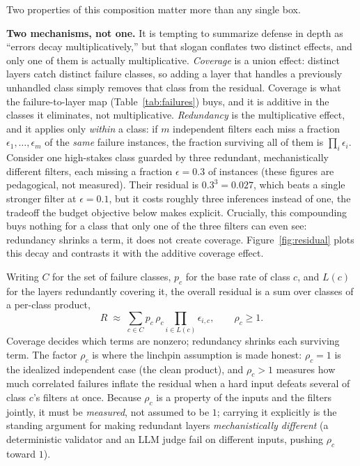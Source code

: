 \documentclass[11pt]{article}
\begin{document}
Two properties of this composition matter more than any single box.

\textbf{Two mechanisms, not one.} It is tempting to summarize defense in depth as
``errors decay multiplicatively,'' but that slogan conflates two distinct effects,
and only one of them is actually multiplicative. \emph{Coverage} is a union
effect: distinct layers catch distinct failure classes, so adding a layer that
handles a previously unhandled class simply removes that class from the residual.
Coverage is what the failure-to-layer map (Table~\ref{tab:failures}) buys, and it
is additive in the classes it eliminates, not multiplicative. \emph{Redundancy}
is the multiplicative effect, and it applies only \emph{within} a class: if $m$
independent filters each miss a fraction $\epsilon_1,\dots,\epsilon_m$ of the
\emph{same} failure instances, the fraction surviving all of them is
$\prod_{i}\epsilon_i$. Consider one high-stakes class guarded by three redundant,
mechanistically different filters, each missing a fraction $\epsilon = 0.3$ of
instances (these figures are pedagogical, not measured). Their residual is
$0.3^3 = 0.027$, which beats a single stronger filter at $\epsilon = 0.1$, but it
costs roughly three inferences instead of one, the tradeoff the budget objective
below makes explicit. Crucially, this compounding buys nothing for a class that
only one of the three filters can even see: redundancy shrinks a term, it does not
create coverage. Figure~\ref{fig:residual} plots this decay and contrasts it with
the additive coverage effect.

Writing $C$ for the set of failure classes, $p_c$ for the base rate of class $c$,
and $L(c)$ for the layers redundantly covering it, the overall residual is a sum
over classes of a per-class product,
\[
  R \;\approx\; \sum_{c \in C} p_c \, \rho_c \!\!\prod_{i \in L(c)} \epsilon_{i,c},
  \qquad \rho_c \ge 1 .
\]
Coverage decides which terms are nonzero; redundancy shrinks each surviving term.
The factor $\rho_c$ is where the linchpin assumption is made honest: $\rho_c = 1$
is the idealized independent case (the clean product), and $\rho_c > 1$ measures
how much correlated failures inflate the residual when a hard input defeats
several of class $c$'s filters at once. Because $\rho_c$ is a property of the
inputs and the filters jointly, it must be \emph{measured}, not assumed to be $1$;
carrying it explicitly is the standing argument for making redundant layers
\emph{mechanistically different} (a deterministic validator and an LLM judge fail
on different inputs, pushing $\rho_c$ toward $1$).
\end{document}
